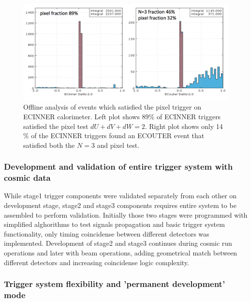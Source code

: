 \begin{figure}[!htb]
 \centering
  \includegraphics[width=1.0\columnwidth,keepaspectratio]{img/PixelFraction.png}
 \caption{Offline analysis of events which satisfied the pixel trigger on ECINNER calorimeter.  Left plot shows 89$\%$ of ECINNER triggers satisfied the pixel test $dU+dV+dW=2$.  Right plot shows only 14$\%$ of the ECINNER triggers found an ECOUTER event that satisfied both the $N=3$ and pixel test. }
\end{figure}

\subsubsection{Development and validation of entire trigger system with cosmic data} 

While stage1 trigger components were validated separately from each other on development stage, stage2 and stage3 components requires entire system to be assembled to perform validation. Initially those two stages were programmed with simplified alghorithms to test signals propagation and basic trigger system functionality, only timing coincidense between different detectors was implemented. Development of stage2 and stage3 continues during cosmic run operations and later with beam operations, adding geometrical match between different detectors and increasing coincidense logic complexity.

\subsubsection{Trigger system flexibility and 'permanent development' mode}

